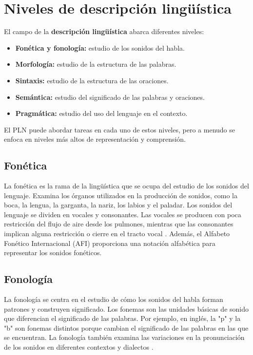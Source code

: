 \section{Niveles de descripción lingüística}

El campo de la \textbf{descripción lingüística} abarca diferentes niveles:

\begin{itemize}
  \item \textbf{Fonética y fonología:} estudio de los sonidos del habla.
  \item \textbf{Morfología:} estudio de la estructura de las palabras.
  \item \textbf{Sintaxis:} estudio de la estructura de las oraciones.
  \item \textbf{Semántica:} estudio del significado de las palabras y oraciones.
  \item \textbf{Pragmática:} estudio del uso del lenguaje en el contexto.
\end{itemize}

El PLN puede abordar tareas en cada uno de estos niveles, pero a menudo se enfoca en niveles más altos de representación y comprensión.




\subsection{Fonética}

La fonética es la rama de la lingüística que se ocupa del estudio de los sonidos del lenguaje. Examina los órganos utilizados en la producción de sonidos, como la boca, la lengua, la garganta, la nariz, los labios y el paladar. Los sonidos del lenguaje se dividen en vocales y consonantes. Las vocales se producen con poca restricción del flujo de aire desde los pulmones, mientras que las consonantes implican alguna restricción o cierre en el tracto vocal \cite{JohnsonMLSS, fromkin2018introduction}. Además, el Alfabeto Fonético Internacional (AFI) proporciona una notación alfabética para representar los sonidos fonéticos.

\subsection{Fonología}

La fonología se centra en el estudio de cómo los sonidos del habla forman patrones y construyen significado. Los fonemas son las unidades básicas de sonido que diferencian el significado de las palabras. Por ejemplo, en inglés, la "p" y la "b" son fonemas distintos porque cambian el significado de las palabras en las que se encuentran. La fonología también examina las variaciones en la pronunciación de los sonidos en diferentes contextos y dialectos \cite{fromkin2018introduction}.


